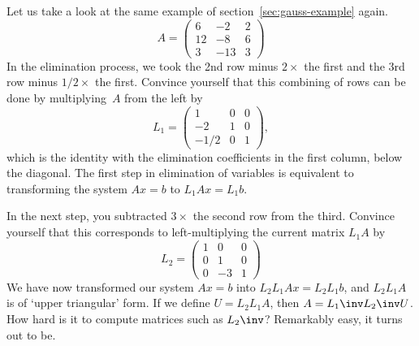 Let us take a look at the same example of section~\ref{sec:gauss-example} again.
  \[ A=
  \left(
    \begin{matrix}
      6&-2&2\\ 12&-8&6\\ 3&-13&3
    \end{matrix}\right)
  \]
In the elimination process, we took
the 2nd row minus $2\times$ the first
and the 3rd row minus $1/2\times$ the first. 
Convince yourself that this combining of rows can be done by
multiplying~$A$ from the left by
  \[ 
  L_1=\left(
    \begin{matrix}
      1&0&0\\ -2&1&0\\ -1/2&0&1
    \end{matrix}\right),
  \]
which is the identity with the elimination coefficients in the first column,
below the diagonal.
The first step in elimination of variables is equivalent
to transforming the system $Ax=b$ to $L_1Ax=L_1b$.

In the next step, you subtracted $3\times$ the second row from the
third. Convince yourself that this corresponds to left-multiplying the
current matrix $L_1A$ by
  \[ L_2=\left(
    \begin{matrix}
      1&0&0\\ 0&1&0\\ 0&-3&1
    \end{matrix}\right)
  \]
We have now transformed our system $Ax=b$ into 
$L_2L_1Ax=L_2L_1b$, and $L_2L_1A$ is of `upper triangular' form.
If we define $U=L_2L_1A$, then $A=L_1\inv L_2\inv U$. How hard is it
to compute matrices such as $L_2\inv$? Remarkably easy, it turns out
to be.

